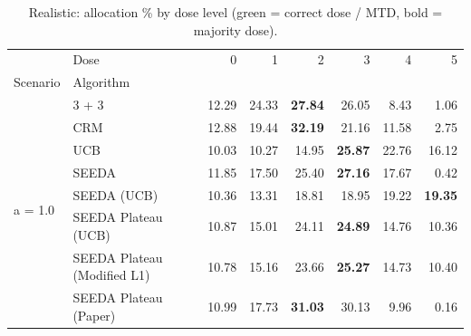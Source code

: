 \begin{table}[H]
\centering
\caption{Realistic: allocation \% by dose level (green = correct dose / MTD, bold = majority dose).}
\label{tab:real_alloc_by_dose}
\begin{tabular}{llrrrrrr}
\toprule
 & Dose & 0 & 1 & 2 & 3 & 4 & 5 \\
Scenario & Algorithm &  &  &  &  &  &  \\
\midrule
\multirow[c]{8}{*}{a = 1.0} & 3 + 3 & 12.29 & 24.33 & {\cellcolor[HTML]{C8E6C9}} \bfseries 27.84 & 26.05 & 8.43 & 1.06 \\
 & CRM & 12.88 & 19.44 & {\cellcolor[HTML]{C8E6C9}} \bfseries 32.19 & 21.16 & 11.58 & 2.75 \\
 & UCB & 10.03 & 10.27 & {\cellcolor[HTML]{C8E6C9}} 14.95 & \bfseries 25.87 & 22.76 & 16.12 \\
 & SEEDA & 11.85 & 17.50 & {\cellcolor[HTML]{C8E6C9}} 25.40 & \bfseries 27.16 & 17.67 & 0.42 \\
 & SEEDA (UCB) & 10.36 & 13.31 & {\cellcolor[HTML]{C8E6C9}} 18.81 & 18.95 & 19.22 & \bfseries 19.35 \\
 & SEEDA Plateau (UCB) & 10.87 & 15.01 & {\cellcolor[HTML]{C8E6C9}} 24.11 & \bfseries 24.89 & 14.76 & 10.36 \\
 & SEEDA Plateau (Modified L1) & 10.78 & 15.16 & {\cellcolor[HTML]{C8E6C9}} 23.66 & \bfseries 25.27 & 14.73 & 10.40 \\
 & SEEDA Plateau (Paper) & 10.99 & 17.73 & {\cellcolor[HTML]{C8E6C9}} \bfseries 31.03 & 30.13 & 9.96 & 0.16 \\
\bottomrule
\end{tabular}
\end{table}
